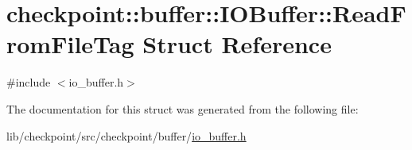 \hypertarget{structcheckpoint_1_1buffer_1_1_i_o_buffer_1_1_read_from_file_tag}{}\section{checkpoint\+:\+:buffer\+:\+:I\+O\+Buffer\+:\+:Read\+From\+File\+Tag Struct Reference}
\label{structcheckpoint_1_1buffer_1_1_i_o_buffer_1_1_read_from_file_tag}


{\ttfamily \#include $<$io\+\_\+buffer.\+h$>$}



The documentation for this struct was generated from the following file\+:\begin{DoxyCompactItemize}
\item 
lib/checkpoint/src/checkpoint/buffer/\hyperlink{io__buffer_8h}{io\+\_\+buffer.\+h}\end{DoxyCompactItemize}
